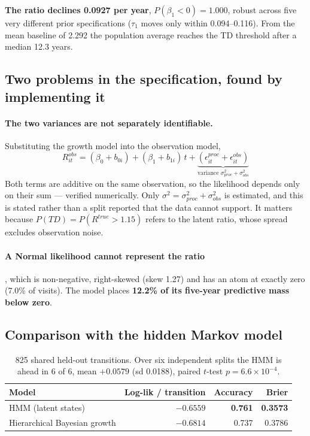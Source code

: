 \documentclass[11pt,a4paper]{article}
\begin{document}
\noindent
\textbf{The ratio declines 0.0927 per year}, $P(\beta_1 < 0) = 1.000$, robust
across five very different prior specifications ($\tau_1$ moves only within
0.094--0.116). From the mean baseline of 2.292 the population average reaches the
TD threshold after a median 12.3 years.

\subsection{Two problems in the specification, found by implementing it}

\paragraph{The two variances are not separately identifiable.} Substituting the
growth model into the observation model,
\[
  R^{obs}_{it} = (\beta_0 + b_{0i}) + (\beta_1 + b_{1i})\,t
    + \underbrace{(\epsilon^{proc}_{it} + \epsilon^{obs}_{it})}_{\text{variance } \sigma^2_{proc} + \sigma^2_{obs}}
\]
Both terms are additive on the same observation, so the likelihood depends only
on their sum --- verified numerically. Only $\sigma^2 = \sigma^2_{proc} +
\sigma^2_{obs}$ is estimated, and this is stated rather than a split reported
that the data cannot support. It matters because $P(TD) = P(R^{true} > 1.15)$
refers to the latent ratio, whose spread excludes observation noise.

\paragraph{A Normal likelihood cannot represent the ratio}, which is
non-negative, right-skewed (skew 1.27) and has an atom at exactly zero (7.0\% of
visits). The model places \textbf{12.2\% of its five-year predictive mass below
zero}.

\subsection{Comparison with the hidden Markov model}

\begin{table}[H]
\centering
\begin{tabular}{@{}lrrr@{}}
\toprule
\textbf{Model} & \textbf{Log-lik / transition} & \textbf{Accuracy} & \textbf{Brier} \\
\midrule
HMM (latent states)          & $\mathbf{-0.6559}$ & \textbf{0.761} & \textbf{0.3573} \\
Hierarchical Bayesian growth & $-0.6814$ & 0.737 & 0.3786 \\
\bottomrule
\end{tabular}
\caption{825 shared held-out transitions. Over six independent splits the HMM is
ahead in 6 of 6, mean $+0.0579$ (sd 0.0188), paired $t$-test $p = 6.6\times10^{-4}$.}
\end{table}
\end{document}
